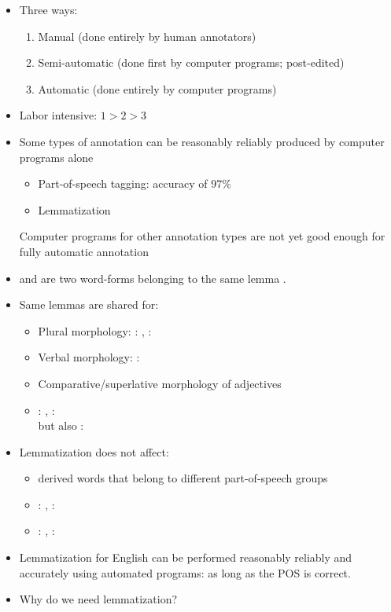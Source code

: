 \documentclass[a4paper,landscape,headrule,footrule,xetex]{foils}
\begin{document}
\begin{itemize}
\item  Three ways:
  \begin{enumerate}
  \item Manual (done entirely by human annotators)
  \item Semi-automatic (done first by computer programs; post-edited)
  \item Automatic (done entirely by computer programs)
  \end{enumerate}
\item  Labor intensive: $1 > 2 > 3$
\item  Some types of annotation can be reasonably reliably produced by computer
   programs alone
\begin{itemize}
\item Part-of-speech tagging: accuracy of 97\%
\item Lemmatization
\end{itemize}
Computer programs for other annotation types are not yet good
enough for fully automatic annotation
\end{itemize}





\begin{itemize}
\item  {} and  are two word-forms belonging to the same lemma .
\item  Same lemmas are shared for:
\begin{itemize}
\item  Plural morphology: : , : 
\item  Verbal morphology: : 
\item  Comparative/superlative morphology of adjectives
\item  {}: , :
\\ but also : 
\end{itemize}
\item  Lemmatization does not affect:
  \begin{itemize}
  \item  derived words that belong to different part-of-speech groups
  \item  {}: , : 
  \item  {}: , : 
  \end{itemize}
\item  Lemmatization for English can be performed reasonably reliably and accurately
using automated programs: as long as the POS is correct.
\item  Why do we need lemmatization?
\end{itemize}
\end{document}
